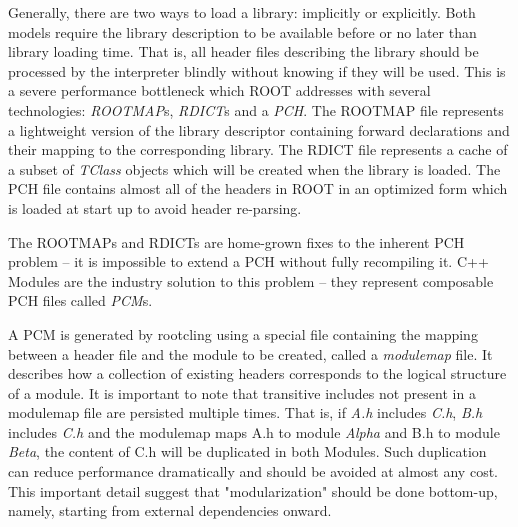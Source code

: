 \documentclass[12pt]{iopart}
\begin{document}
Generally, there are two ways to load a library: implicitly or explicitly. Both models require the library description to be available before or no later than library loading time. That is, all header files describing the library should be processed by the interpreter blindly without knowing if they will be used. This is a severe performance bottleneck which ROOT addresses with several technologies: \textit{ROOTMAP}s, \textit{RDICT}s and a \textit{PCH}. The ROOTMAP file represents a lightweight version of the library descriptor containing forward declarations and their mapping to the corresponding library. The RDICT file represents a cache of a subset of \textit{TClass} objects which will be created when the library is loaded. The PCH file contains almost all of the headers in ROOT in an optimized form which is loaded at start up to avoid header re-parsing.

The ROOTMAPs and RDICTs are home-grown fixes to the inherent PCH problem -- it is impossible to extend a PCH without fully recompiling it. C++ Modules are the industry solution to this problem -- they represent composable PCH files called \textit{PCM}s.

A PCM is generated by rootcling using a special file containing the mapping between a header file and the module to be created, called a \textit{modulemap} file. It describes how a collection of existing headers corresponds to the logical structure of a module. It is important to note that transitive includes not present in a modulemap file are persisted multiple times. That is, if \textit{A.h} includes \textit{C.h}, \textit{B.h} includes \textit{C.h} and the modulemap maps A.h to module \textit{Alpha} and B.h to module \textit{Beta}, the content of C.h will be duplicated in both Modules. Such duplication can reduce performance dramatically and should be avoided at almost any cost. This important detail suggest that "modularization" should be done bottom-up, namely, starting from external dependencies onward.

\end{document}
